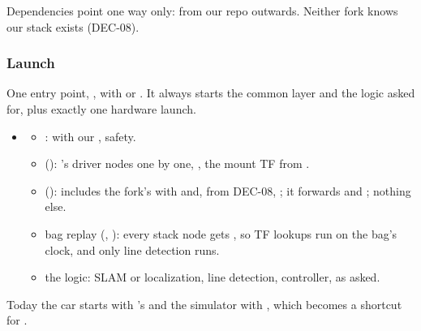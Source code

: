\documentclass[11pt,a4paper]{article}
\newcommand{\prop}{\target{Proposed}}
\begin{document}
Dependencies point one way only: from our repo outwards. Neither fork knows our stack exists (DEC-08).

\subsubsection{Launch}
One entry point, , with  or . It always starts the common layer and the logic asked for, plus exactly one hardware launch. \prop
\begin{itemize}
  \item {}
  \begin{itemize}
    \item {}:  with our , safety.
    \item {} (): 's driver nodes one by one, , the mount TF from .
    \item {} (): includes the fork's  with  and, from DEC-08, ; it forwards  and ; nothing else.
    \item bag replay (, ): every stack node gets , so TF lookups run on the bag's clock, and only line detection runs.
    \item the logic: SLAM or localization, line detection, controller, as asked.
  \end{itemize}
\end{itemize}
Today the car starts with 's  and the simulator with , which becomes a shortcut for .
\end{document}

